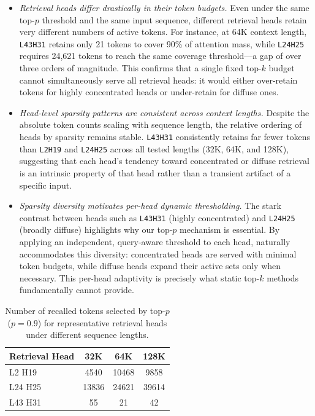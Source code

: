 \begin{itemize}[leftmargin=*, itemindent=0pt]
    \item \emph{Retrieval heads differ drastically in their token budgets.} 
    Even under the same top-$p$ threshold and the same input sequence, different 
    retrieval heads retain very different numbers of active tokens. For instance, 
    at 64K context length, \texttt{L43H31} retains only 21 tokens to cover 90\% 
    of attention mass, while \texttt{L24H25} requires 24{,}621 tokens to reach 
    the same coverage threshold---a gap of over three orders of magnitude. This 
    confirms that a single fixed top-$k$ budget cannot simultaneously serve all 
    retrieval heads: it would either over-retain tokens for highly concentrated 
    heads or under-retain for diffuse ones.

    \item \emph{Head-level sparsity patterns are consistent across context lengths.}
    Despite the absolute token counts scaling with sequence length, the relative 
    ordering of heads by sparsity remains stable. \texttt{L43H31} consistently 
    retains far fewer tokens than \texttt{L2H19} and \texttt{L24H25} across all 
    tested lengths (32K, 64K, and 128K), suggesting that each head's tendency 
    toward concentrated or diffuse retrieval is an intrinsic property of that head 
    rather than a transient artifact of a specific input.

    \item \emph{Sparsity diversity motivates per-head dynamic thresholding.}
    The stark contrast between heads such as \texttt{L43H31} (highly concentrated) 
    and \texttt{L24H25} (broadly diffuse) highlights why our top-$p$ mechanism 
    is essential. By applying an independent, query-aware threshold to each head, 
    \name naturally accommodates this diversity: concentrated heads are served 
    with minimal token budgets, while diffuse heads expand their active sets only 
    when necessary. This per-head adaptivity is precisely what static top-$k$ 
    methods fundamentally cannot provide.
\end{itemize}

\begin{table}[ht]
    \centering
    \small
    \caption{Number of recalled tokens selected by top-$p$ ($p=0.9$) for representative retrieval heads under different sequence lengths.}
    \label{tab:appendix_headwise_topp_tokens}
    \begin{tabular}{lccc}
        \toprule
        \textbf{Retrieval Head} & \textbf{32K} & \textbf{64K} & \textbf{128K} \\
        \midrule
        L2 H19  & 4540 & 10468 & 9858 \\
        L24 H25 & 13836 & 24621 & 39614 \\
        L43 H31 & 55 & 21 & 42 \\
        \bottomrule
    \end{tabular}
\end{table}

